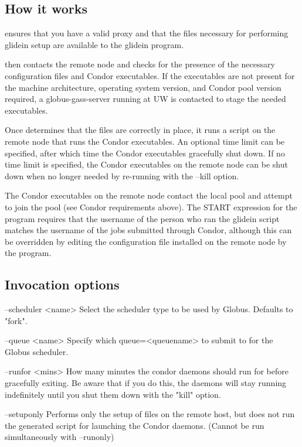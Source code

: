 \subsection{How it works}
 ensures that you have a valid proxy and that the files
necessary for performing glidein setup are available to the glidein
program. 

 then contacts the remote node and checks for the
presence of the necessary configuration files and Condor executables.
If the executables are not present for the machine architecture, 
operating system version, and Condor pool version required, a 
globus-gass-server running at UW is contacted to stage the needed
executables.

Once  determines that the files are correctly in place,
it runs a script on the remote node that runs the Condor executables.
An optional time limit can be specified, after which time the Condor 
executables gracefully shut down. If no time limit is specified, the 
Condor executables on the remote node can be shut down when no longer
needed by re-running  with the --kill option.

The Condor executables on the remote node contact the local pool and
attempt to join the pool (see Condor requirements above). The START
expression for the  program requires that the username
of the person who ran the glidein script matches the username of the
jobs submitted through Condor, although this can be overridden by
editing the configuration file installed on the remote node by the
 program.

\subsection{Invocation options}
--scheduler <name>
	Select the scheduler type to be used by Globus. Defaults to "fork".

--queue <name>
	Specify which queue=<queuename> to submit to for the Globus scheduler.

--runfor <mins>
   How many minutes the condor daemons should run for before gracefully
   exiting.  
   Be aware that if you do this, the daemons will stay running indefinitely
   until you shut them down with the "kill" option.

--setuponly
   Performs only the setup of files on the remote host, but does not
   run the generated script for launching the Condor daemons.
   (Cannot be run simultaneously with --runonly)

